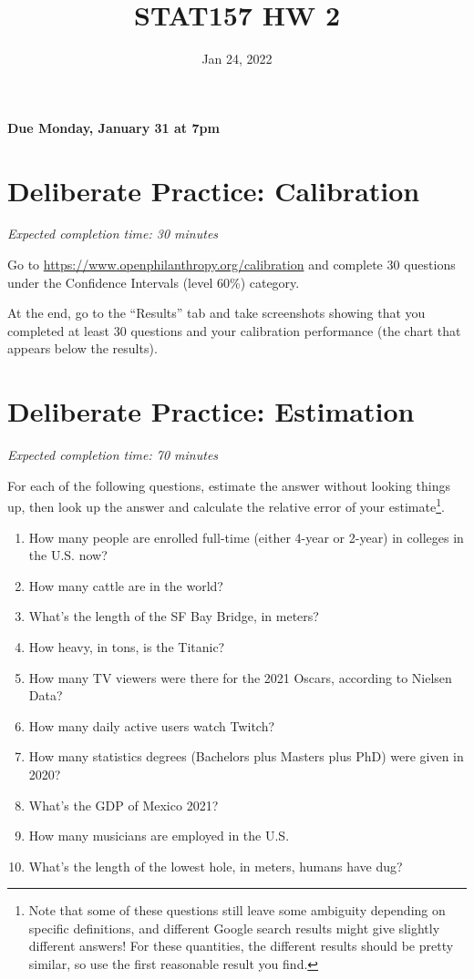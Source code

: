 \documentclass[11pt]{article}
\title{STAT157 HW 2}
\date{Jan 24, 2022}
\begin{document}
\maketitle

\hfill \textbf{Due Monday, January 31 at 7pm}

\section*{Deliberate Practice: Calibration}

\emph{Expected completion time: 30 minutes}

Go to \url{https://www.openphilanthropy.org/calibration} and complete 30 questions under the Confidence Intervals (level 60\%) category.

At the end, go to the ``Results'' tab and take screenshots showing that 
you completed at least 30 questions and your calibration 
performance (the chart that appears below the results).

\section*{Deliberate Practice: Estimation}

\emph{Expected completion time: 70 minutes}

For each of the following questions, estimate the answer without looking things up, then look up the answer and calculate the relative error of your estimate\footnote{Note that some of these questions still leave some ambiguity depending on specific definitions, and different Google search results might give slightly different answers! For these quantities, the different results should be pretty similar, so use the first reasonable result you find.}. 


\begin{enumerate}
	\item How many people are enrolled full-time (either 4-year or 2-year) in colleges in the U.S. now? 
	\item How many cattle are in the world? 
	\item What's the length of the SF Bay Bridge, in meters? 
	\item How heavy, in tons, is the Titanic? 
	\item How many TV viewers were there for the 2021 Oscars, according to Nielsen Data? 
	\item How many daily active users watch Twitch? 
	\item How many statistics degrees (Bachelors plus Masters plus PhD) were given in 2020? 
	\item What's the GDP of Mexico 2021? 
	\item How many musicians are employed in the U.S. 
	\item What's the length of the lowest hole, in meters, humans have dug? 
\end{enumerate}
\end{document}
